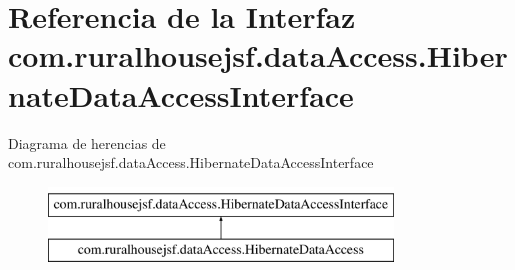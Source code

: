 \hypertarget{interfacecom_1_1ruralhousejsf_1_1data_access_1_1_hibernate_data_access_interface}{}\section{Referencia de la Interfaz com.\+ruralhousejsf.\+data\+Access.\+Hibernate\+Data\+Access\+Interface}
\label{interfacecom_1_1ruralhousejsf_1_1data_access_1_1_hibernate_data_access_interface}
Diagrama de herencias de com.\+ruralhousejsf.\+data\+Access.\+Hibernate\+Data\+Access\+Interface\begin{figure}[H]
\begin{center}
\leavevmode
\includegraphics[height=2.000000cm]{dd/d1c/interfacecom_1_1ruralhousejsf_1_1data_access_1_1_hibernate_data_access_interface}
\end{center}
\end{figure}
